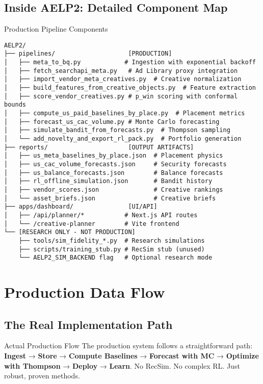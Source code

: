 \documentclass[11pt,a4paper]{report}
\begin{document}
\subsection{Inside AELP2: Detailed Component Map}

\begin{techbox}{Production Pipeline Components}
\begin{verbatim}
AELP2/
├── pipelines/                    [PRODUCTION]
│   ├── meta_to_bq.py            # Ingestion with exponential backoff
│   ├── fetch_searchapi_meta.py   # Ad Library proxy integration
│   ├── import_vendor_meta_creatives.py  # Creative normalization
│   ├── build_features_from_creative_objects.py  # Feature extraction
│   ├── score_vendor_creatives.py # p_win scoring with conformal bounds
│   ├── compute_us_paid_baselines_by_place.py  # Placement metrics
│   ├── forecast_us_cac_volume.py # Monte Carlo forecasting
│   ├── simulate_bandit_from_forecasts.py  # Thompson sampling
│   └── add_novelty_and_export_rl_pack.py  # Portfolio generation
├── reports/                      [OUTPUT ARTIFACTS]
│   ├── us_meta_baselines_by_place.json  # Placement physics
│   ├── us_cac_volume_forecasts.json     # Security forecasts
│   ├── us_balance_forecasts.json        # Balance forecasts
│   ├── rl_offline_simulation.json       # Bandit history
│   ├── vendor_scores.json               # Creative rankings
│   └── asset_briefs.json                # Creative briefs
├── apps/dashboard/               [UI/API]
│   ├── /api/planner/*           # Next.js API routes
│   └── /creative-planner        # Vite frontend
└── [RESEARCH ONLY - NOT PRODUCTION]
    ├── tools/sim_fidelity_*.py  # Research simulations
    ├── scripts/training_stub.py # RecSim stub (unused)
    └── AELP2_SIM_BACKEND flag   # Optional research mode
\end{verbatim}
\end{techbox}

\section{Production Data Flow}

\subsection{The Real Implementation Path}

\begin{insightbox}{Actual Production Flow}
The production system follows a straightforward path: \textbf{Ingest} → \textbf{Store} → \textbf{Compute Baselines} → \textbf{Forecast with MC} → \textbf{Optimize with Thompson} → \textbf{Deploy} → \textbf{Learn}. No RecSim. No complex RL. Just robust, proven methods.
\end{insightbox}
\end{document}
